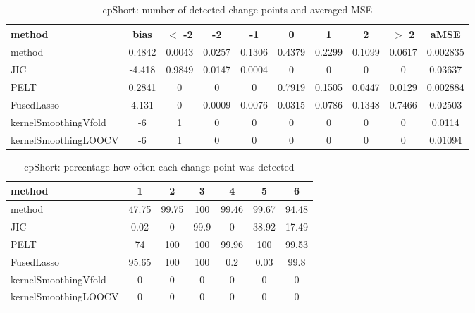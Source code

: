 \begin{table}[ht]
\centering
\begin{tabular}{l|c|ccccccc|c}
  \hline
method & bias & $<$ -2 & -2 & -1 & 0 & 1 & 2 & $>$ 2 & aMSE \\ 
  \hline
method & 0.4842 & 0.0043 & 0.0257 & 0.1306 & 0.4379 & 0.2299 & 0.1099 & 0.0617 & 0.002835 \\ 
  JIC & -4.418 & 0.9849 & 0.0147 & 0.0004 &     0 &     0 &     0 &     0 & 0.03637 \\ 
  PELT & 0.2841 &     0 &     0 &     0 & 0.7919 & 0.1505 & 0.0447 & 0.0129 & 0.002884 \\ 
  FusedLasso & 4.131 &     0 & 0.0009 & 0.0076 & 0.0315 & 0.0786 & 0.1348 & 0.7466 & 0.02503 \\ 
  kernelSmoothingVfold &    -6 &     1 &     0 &     0 &     0 &     0 &     0 &     0 & 0.0114 \\ 
  kernelSmoothingLOOCV &    -6 &     1 &     0 &     0 &     0 &     0 &     0 &     0 & 0.01094 \\ 
   \hline
\end{tabular}
\caption{cpShort: number of detected change-points and averaged MSE} 
\label{tab:cpShortNjumps}
\end{table}
\begin{table}[ht]
\centering
\begin{tabular}{l|cccccc}
  \hline
method & 1 & 2 & 3 & 4 & 5 & 6 \\ 
  \hline
method &  47.75 &  99.75 &    100 &  99.46 &  99.67 &  94.48 \\ 
  JIC &   0.02 &      0 &   99.9 &      0 &  38.92 &  17.49 \\ 
  PELT &     74 &    100 &    100 &  99.96 &    100 &  99.53 \\ 
  FusedLasso &  95.65 &    100 &    100 &    0.2 &   0.03 &   99.8 \\ 
  kernelSmoothingVfold &      0 &      0 &      0 &      0 &      0 &      0 \\ 
  kernelSmoothingLOOCV &      0 &      0 &      0 &      0 &      0 &      0 \\ 
   \hline
\end{tabular}
\caption{cpShort: percentage how often each change-point was detected} 
\label{tab:cpShortDetections}
\end{table}
